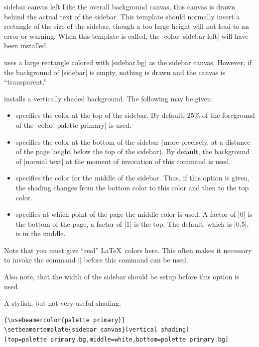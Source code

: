 \begin{element}{sidebar canvas left}\yes\no\no
  Like the overall background canvas, this canvas is drawn behind the actual text of the sidebar. This template should normally insert a rectangle of the size of the sidebar, though a too large height will not lead to an error or warning. When this template is called, the \beamer-color |sidebar left| will have been installed.

  \begin{templateoptions}
    uses a large rectangle colored with |sidebar.bg| as the sidebar canvas. However, if the background of |sidebar| is empty, nothing is drawn and the canvas is ``transparent.''

    installs a vertically shaded background. The following  may be given:
    \begin{itemize}
    \item
       specifies the color at the top of the sidebar. By default, 25\% of the foreground of the \beamer-color |palette primary| is used.
    \item
       specifies the color at the bottom of the sidebar (more precisely, at a distance of the page height below the top of the sidebar). By default, the background of |normal text| at the moment of invocation of this command is used.
    \item
       specifies the color for the middle of the sidebar. Thus, if this option is given, the shading changes from the bottom color to this color and then to the top color.
    \item
       specifies at which point of the page the middle color is used. A factor of |0| is the bottom of the page, a factor of |1| is the top. The default, which is |0.5|, is in the middle.
    \end{itemize}
    Note that you must give ``real'' \LaTeX\ colors here. This often makes it necessary to invoke the command |\usebeamercolor| before this command can be used.

    Also note, that the width of the sidebar should be setup before this option is used.

    \example
    A stylish, but not very useful shading:

\begin{verbatim}
{\usebeamercolor{palette primary}}
\setbeamertemplate{sidebar canvas}[vertical shading]
[top=palette primary.bg,middle=white,bottom=palette primary.bg]
\end{verbatim}


\end{templateoptions}
\end{element}
